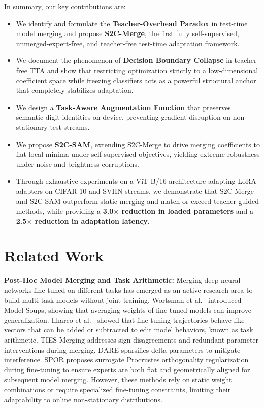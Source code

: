 \documentclass{article}
\theoremstyle{plain}
\theoremstyle{definition}
\theoremstyle{remark}
\begin{document}
In summary, our key contributions are:
\begin{itemize}
    \item We identify and formulate the \textbf{Teacher-Overhead Paradox} in test-time model merging and propose \textbf{S2C-Merge}, the first fully self-supervised, unmerged-expert-free, and teacher-free test-time adaptation framework.
    \item We document the phenomenon of \textbf{Decision Boundary Collapse} in teacher-free TTA and show that restricting optimization strictly to a low-dimensional coefficient space while freezing classifiers acts as a powerful structural anchor that completely stabilizes adaptation.
    \item We design a \textbf{Task-Aware Augmentation Function} that preserves semantic digit identities on-device, preventing gradient disruption on non-stationary test streams.
    \item We propose \textbf{S2C-SAM}, extending S2C-Merge to drive merging coefficients to flat local minima under self-supervised objectives, yielding extreme robustness under noise and brightness corruptions.
    \item Through exhaustive experiments on a ViT-B/16 architecture adapting LoRA adapters on CIFAR-10 and SVHN streams, we demonstrate that S2C-Merge and S2C-SAM outperform static merging and match or exceed teacher-guided methods, while providing a \textbf{3.0$\times$ reduction in loaded parameters} and a \textbf{2.5$\times$ reduction in adaptation latency}.
\end{itemize}

\section{Related Work}
\label{sec:related_work}

\textbf{Post-Hoc Model Merging and Task Arithmetic:} Merging deep neural networks fine-tuned on different tasks has emerged as an active research area to build multi-task models without joint training. Wortsman et al.\  introduced Model Soups, showing that averaging weights of fine-tuned models can improve generalization. Ilharco et al.\  showed that fine-tuning trajectories behave like vectors that can be added or subtracted to edit model behaviors, known as task arithmetic. TIES-Merging \cite{yadav2023ties} addresses sign disagreements and redundant parameter interventions during merging. DARE \cite{yu2024dare} sparsifies delta parameters to mitigate interference. SPOR \cite{papers/submission5.pdf} proposes surrogate Procrustes orthogonality regularization during fine-tuning to ensure experts are both flat and geometrically aligned for subsequent model merging. However, these methods rely on static weight combinations or require specialized fine-tuning constraints, limiting their adaptability to online non-stationary distributions.
\end{document}
